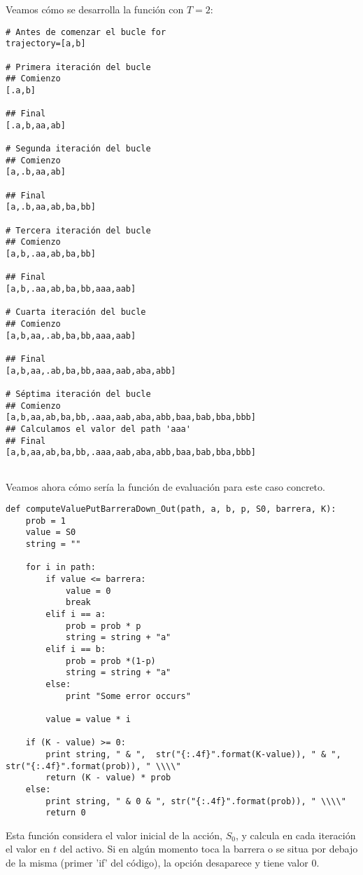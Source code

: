 \begin{problem}[1]
\begin{example}
Veamos cómo se desarrolla la función con $T=2$:
\begin{multicols}{2}
\begin{Verbatim}[fontsize=\small]
# Antes de comenzar el bucle for
trajectory=[a,b]

# Primera iteración del bucle
## Comienzo
[.a,b]

## Final
[.a,b,aa,ab]

# Segunda iteración del bucle
## Comienzo
[a,.b,aa,ab]

## Final
[a,.b,aa,ab,ba,bb]

# Tercera iteración del bucle
## Comienzo
[a,b,.aa,ab,ba,bb]

## Final
[a,b,.aa,ab,ba,bb,aaa,aab]

# Cuarta iteración del bucle
## Comienzo
[a,b,aa,.ab,ba,bb,aaa,aab]

## Final
[a,b,aa,.ab,ba,bb,aaa,aab,aba,abb]

# Séptima iteración del bucle
## Comienzo
[a,b,aa,ab,ba,bb,.aaa,aab,aba,abb,baa,bab,bba,bbb]
## Calculamos el valor del path 'aaa'
## Final
[a,b,aa,ab,ba,bb,.aaa,aab,aba,abb,baa,bab,bba,bbb]


\end{Verbatim}
\end{multicols}
\end{example}

Veamos ahora cómo sería la función de evaluación para este caso concreto.

\begin{lstlisting}
def computeValuePutBarreraDown_Out(path, a, b, p, S0, barrera, K):
	prob = 1
	value = S0
	string = ""

	for i in path:
		if value <= barrera:
			value = 0
			break
		elif i == a:
			prob = prob * p
			string = string + "a"
		elif i == b:
			prob = prob *(1-p)
			string = string + "a"
		else:
			print "Some error occurs"

		value = value * i

	if (K - value) >= 0:
		print string, " & ",  str("{:.4f}".format(K-value)), " & ", str("{:.4f}".format(prob)), " \\\\"
		return (K - value) * prob
	else:
		print string, " & 0 & ", str("{:.4f}".format(prob)), " \\\\"
		return 0
\end{lstlisting}

Esta función considera el valor inicial de la acción, $S_0$, y calcula en cada iteración el valor en $t$ del activo. Si en algún momento toca la barrera o se situa por debajo de la misma (primer 'if' del código), la opción desaparece y tiene valor 0.


\end{problem}
